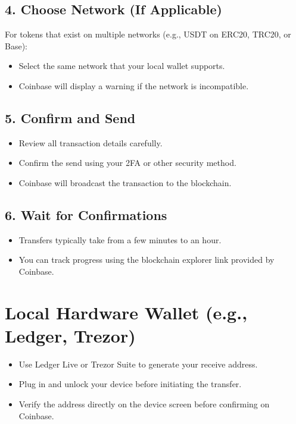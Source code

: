 \documentclass{article}
\begin{document}
\subsection*{4. Choose Network (If Applicable)}
For tokens that exist on multiple networks (e.g., USDT on ERC20, TRC20, or Base):
\begin{itemize}
    \item Select the same network that your local wallet supports.
    \item Coinbase will display a warning if the network is incompatible.
\end{itemize}

\subsection*{5. Confirm and Send}
\begin{itemize}
    \item Review all transaction details carefully.
    \item Confirm the send using your 2FA or other security method.
    \item Coinbase will broadcast the transaction to the blockchain.
\end{itemize}

\subsection*{6. Wait for Confirmations}
\begin{itemize}
    \item Transfers typically take from a few minutes to an hour.
    \item You can track progress using the blockchain explorer link provided by Coinbase.
\end{itemize}

\section{Local Hardware Wallet (e.g., Ledger, Trezor)}
\begin{itemize}
    \item Use Ledger Live or Trezor Suite to generate your receive address.
    \item Plug in and unlock your device before initiating the transfer.
    \item Verify the address directly on the device screen before confirming on Coinbase.
\end{itemize}
\end{document}
